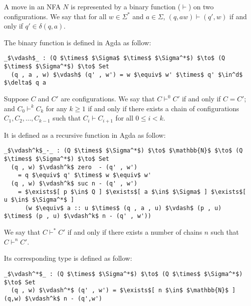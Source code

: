 \begin{defn}
\noindent A move in an NFA \(N\) is
represented by a binary function (\(\vdash\)) on two configurations. We say
that for all \(w \in \Sigma^*\) and \(a \in \Sigma\), \((q, aw)
\vdash (q' , w)\) if and only if \(q' \in \delta (q , a)\). 
\end{defn}

\par The binary function is defined in Agda as follow: 
\begin{lstlisting}[mathescape=true,xleftmargin=.3\textwidth]
  _$\vdash$_ : (Q $\times$ $\Sigma$ $\times$ $\Sigma^*$) $\to$ (Q $\times$ $\Sigma^*$) $\to$ Set
  (q , a , w) $\vdash$ (q' , w') = w $\equiv$ w' $\times$ q' $\in^d$ $\delta$ q a
\end{lstlisting}

\begin{defn}
\noindent Suppose \(C\) and \(C'\) are configurations. We say that \(C \vdash^0 C'\) if and only
if \(C = C'\); and \(C_0 \vdash^k C_k\) for any \(k \geq 1\) if and only if there exists a chain of
configurations \(C_1, C_2, ..., C_{k-1}\) such that \(C_i \vdash C_{i+1}\) for all \(0 \leq i < k\). 
\end{defn}

\par It is defined as a recursive function in Agda as follow: 
\begin{lstlisting}[mathescape=true,xleftmargin=.3\textwidth]
  _$\vdash^k$_-_ : (Q $\times$ $\Sigma^*$) $\to$ $\mathbb{N}$ $\to$ (Q $\times$ $\Sigma^*$) $\to$ Set
  (q , w) $\vdash^k$ zero  - (q' , w')
    = q $\equiv$ q' $\times$ w $\equiv$ w'
  (q , w) $\vdash^k$ suc n - (q' , w') 
    = $\exists$[ p $\in$ Q ] $\exists$[ a $\in$ $\Sigma$ ] $\exists$[ u $\in$ $\Sigma^*$ ]
      (w $\equiv$ a :: u $\times$ (q , a , u) $\vdash$ (p , u) $\times$ (p , u) $\vdash^k$ n - (q' , w'))
\end{lstlisting}

\begin{defn}
\noindent We say that \(C \vdash^* C'\) if and only
if there exists a number of chains \(n\) such that \(C \vdash^n C'\). 
\end{defn}

\par Its corresponding type is defined as follow: 
\begin{lstlisting}[mathescape=true,xleftmargin=.3\textwidth]
  _$\vdash^*$_ : (Q $\times$ $\Sigma^*$) $\to$ (Q $\times$ $\Sigma^*$) $\to$ Set
  (q , w) $\vdash^*$ (q' , w') = $\exists$[ n $\in$ $\mathbb{N}$ ] (q,w) $\vdash^k$ n - (q',w')
\end{lstlisting}

